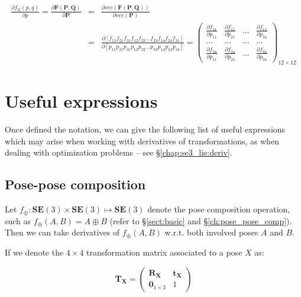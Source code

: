 \documentclass[a4paper,11pt]{report}
\begin{document}
\begin{eqnarray}
\label{eq:deriv_sample3}
\frac{\partial f_\oplus(p,q)}{\partial p} = 
\frac{\partial \mathbf{F} (\mathbf{P},\mathbf{Q})}{\partial \mathbf{P}}
&=&
\frac{\partial vec( \mathbf{F} (\mathbf{P},\mathbf{Q})) }{\partial vec(\mathbf{P}) }
\\
&=&
\frac{\partial [
f_{11} f_{21} f_{31} 
f_{12} f_{22} ...  
f_{33} f_{14} f_{24} f_{34}] }
{\partial [
p_{11} p_{21} p_{31} 
p_{12} p_{22} ... 
p_{33} p_{14} p_{24} p_{34}] } 
=
\left(
\begin{array}{cccc}
 \frac{\partial f_{11}}{\partial  p_{11} } &  \frac{\partial f_{11}}{\partial  p_{21} } & ...  & \frac{\partial f_{11}}{\partial  p_{34} } \\
  ... & ... & ... & ... \\ 
 \frac{\partial f_{34}}{\partial  p_{11} } &  \frac{\partial f_{34}}{\partial  p_{21} } & ...  & \frac{\partial f_{34}}{\partial  p_{34} }
\end{array}
\right)_{12 \times 12}
\end{eqnarray}



\section{Useful expressions}
\label{sect:mat_deriv:exp}

Once defined the notation, we can give the following list of 
useful expressions which may arise when working with derivatives of transformations,
as when dealing with optimization problems -- see \S\ref{chap:se3_lie:deriv}.


\subsection{Pose-pose composition}
\label{sect:jacob_pose_pose_comp}

Let $f_\oplus: \mathbf{SE}(3) \times \mathbf{SE}(3) \mapsto \mathbf{SE}(3)$ denote 
the pose composition operation, 
such as $f_\oplus(A,B) = A \oplus B$ 
(refer to \S\ref{sect:basic} and \S\ref{ch:pose_pose_comp}).
Then we can take derivatives of $f_\oplus(A,B)$ w.r.t. both involved poses $A$ and $B$. 

If we denote the $4 \times 4$ transformation matrix associated to a pose $X$ as:

\begin{equation}
 \mathbf{T_X} = 
\left(
\begin{array}{c|c}
  \mathbf{R_X} & \mathbf{t_X} \\
\hline
  \mathbf{0}_{1\times 3} & 1
\end{array}
\right) 
\end{equation}
\end{document}
